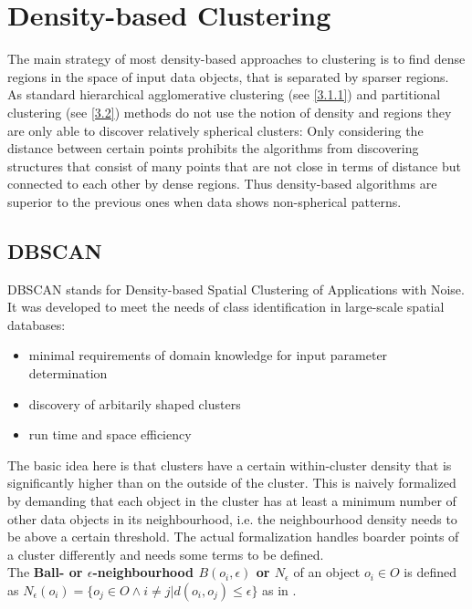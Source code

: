 \section{Density-based Clustering}
The main strategy of most density-based approaches to clustering is to find dense regions in the space of input data objects, that is separated by sparser regions. As standard hierarchical agglomerative clustering (see \ref{3.1.1}) and partitional clustering (see \ref{3.2}) methods do not use the notion of density and regions they are only able to discover relatively spherical clusters: Only considering the distance between certain points prohibits the algorithms from discovering structures that consist of many points that are not close in terms of distance but connected to each other by dense regions. Thus density-based algorithms are superior to the previous ones when data shows non-spherical patterns. \\

\subsection{DBSCAN}\label{\positionnumber}
DBSCAN\cite{dbscan} stands for Density-based Spatial Clustering of Applications with Noise. It was developed to meet the needs of class identification in large-scale spatial databases:
\begin{itemize}
    \item minimal requirements of domain knowledge for input parameter determination
    \item discovery of arbitarily shaped clusters
    \item run time and space efficiency
\end{itemize}
The basic idea here is that clusters have a certain within-cluster density that is significantly higher than on the outside of the cluster. This is naively formalized by demanding that each object in the cluster has at least a minimum number of other data objects in its neighbourhood, i.e. the neighbourhood density needs to be above a certain threshold. The actual formalization handles boarder points of a cluster differently and needs some terms to be defined. \\

The \textbf{Ball- or $\epsilon$-neighbourhood $B(o_i, \epsilon)$ or $N_\epsilon$} of an object $o_i \in O$ is defined as $N_\epsilon(o_i) = \{o_j \in O \wedge i \neq j | d(o_i, o_j) \leq \epsilon \}$ as in . \\

